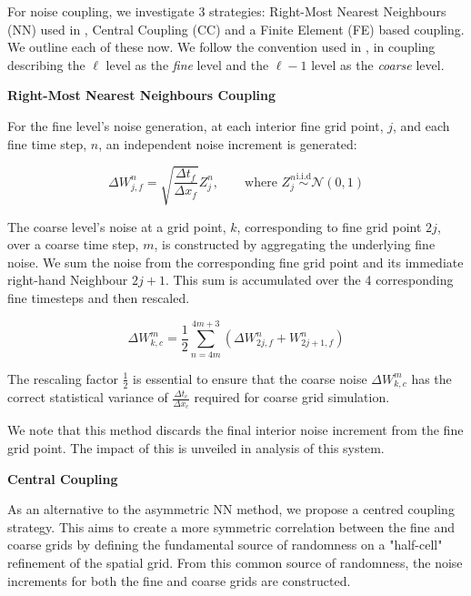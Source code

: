 For noise coupling, we investigate 3 strategies: Right-Most Nearest Neighbours (NN)
used in \cite{cornalba2025multilevel}, Central Coupling (CC) and a Finite Element (FE)
based coupling. We outline each of these now. We follow the convention used in 
\cite{giles2015multilevel}, in coupling describing the $\ell$ level as 
the \textit{fine} level and the $\ell - 1$ level as the \textit{coarse} level.
\newline

\textbf{Right-Most Nearest Neighbours Coupling}

For the fine level's noise generation, at each interior fine grid point, $j$, and each fine 
time step, $n$, an independent noise increment is generated:

\begin{equation*}
    \Delta W_{j,f}^n = \sqrt{\frac{\Delta t_f}{\Delta x_f}} Z_j^n, \qquad \text{where } 
    Z_j^n \overset{\mathrm{i.i.d}}{\sim} \mathcal{N}(0,1)
\end{equation*}

The coarse level's noise at a grid point, $k$,
corresponding to fine grid point $2j$,
over a coarse time step, $m$, is constructed by 
aggregating the underlying fine noise. We sum 
the noise from the corresponding fine grid point
and its immediate right-hand Neighbour
$2j + 1$. This sum is accumulated over 
the 4 corresponding fine timesteps 
and then rescaled.

\begin{equation*}
    \Delta W_{k,c}^m = \frac{1}{2} \sum_{n = 4m}^{4m+3}
    \left(\Delta W_{2j,f}^n + W_{2j+1, f}^n \right)
\end{equation*}

The rescaling factor $\frac{1}{2}$ is essential to 
ensure that the coarse noise $\Delta W_{k,c}^m$
has the correct statistical variance of 
$\frac{\Delta t_c}{\Delta x_c}$ required for 
coarse grid simulation.

We note that this method discards the final 
interior noise increment from the fine grid
point. The impact of this 
is unveiled in analysis of this system.
\newline

\textbf{Central Coupling}

As an alternative to the asymmetric NN method, we
propose a centred coupling strategy. This aims 
to create a more symmetric correlation between the fine 
and coarse grids by defining the fundamental source 
of randomness on a "half-cell" refinement of the 
spatial grid. From this common source of randomness, 
the noise increments for both the fine and coarse 
grids are constructed. 

